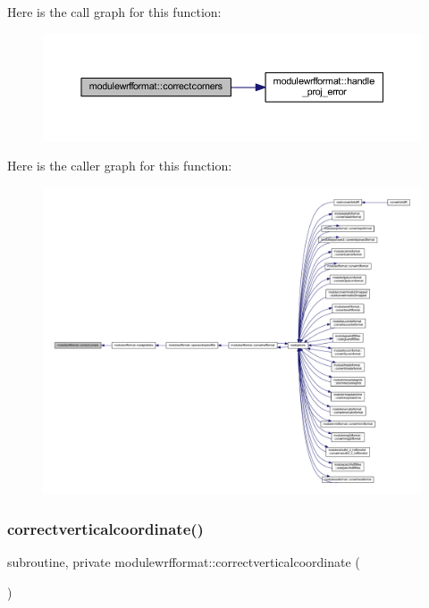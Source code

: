 Here is the call graph for this function\+:\nopagebreak
\begin{figure}[H]
\begin{center}
\leavevmode
\includegraphics[width=350pt]{namespacemodulewrfformat_a79b585a2293851b1ed94e43076fb4779_cgraph}
\end{center}
\end{figure}
Here is the caller graph for this function\+:\nopagebreak
\begin{figure}[H]
\begin{center}
\leavevmode
\includegraphics[width=350pt]{namespacemodulewrfformat_a79b585a2293851b1ed94e43076fb4779_icgraph}
\end{center}
\end{figure}
\mbox{\label{namespacemodulewrfformat_ac71176572d5f88cc34053061c13c6256}} 
\subsubsection{\texorpdfstring{correctverticalcoordinate()}{correctverticalcoordinate()}}
{\footnotesize\ttfamily subroutine, private modulewrfformat\+::correctverticalcoordinate (\begin{DoxyParamCaption}{ }\end{DoxyParamCaption})\hspace{0.3cm}{\ttfamily [private]}}


